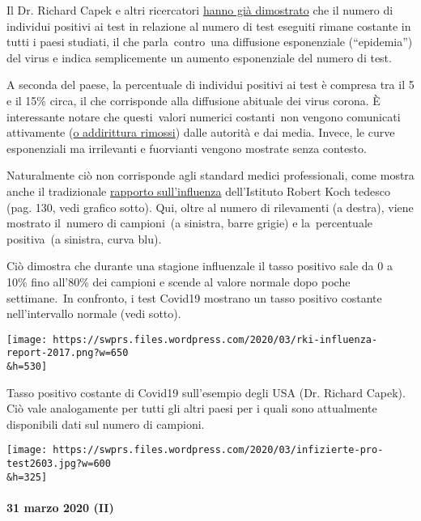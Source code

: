 Il Dr. Richard Capek e altri ricercatori
\href{https://coronadaten.wordpress.com/}{hanno già dimostrato} che il
numero di individui positivi ai test in relazione al numero di test
eseguiti rimane costante in tutti i paesi studiati, il che
parla~contro~una diffusione esponenziale (``epidemia'') del virus e
indica semplicemente un aumento esponenziale del numero di test.

A seconda del paese, la percentuale di individui positivi ai test è
compresa tra il 5 e il 15\% circa, il che corrisponde alla diffusione
abituale dei virus corona. È interessante notare che questi~valori
numerici costanti~non vengono comunicati attivamente
(\href{https://multipolar-magazin.de/artikel/coronavirus-irrefuhrung-fallzahlen}{o
addirittura rimossi}) dalle autorità e dai media. Invece, le curve
esponenziali ma irrilevanti e fuorvianti vengono mostrate senza
contesto.

Naturalmente ciò non corrisponde agli standard medici professionali,
come mostra anche il tradizionale
\href{https://influenza.rki.de/Saisonberichte/2017.pdf}{rapporto
sull'influenza} dell'Istituto Robert Koch tedesco (pag. 130, vedi
grafico sotto). Qui, oltre al numero di rilevamenti (a destra), viene
mostrato il~numero di campioni~(a sinistra, barre grigie) e
la~percentuale positiva~(a sinistra, curva blu).

Ciò dimostra che durante una stagione influenzale il tasso positivo sale
da 0 a 10\% fino all'80\% dei campioni e scende al valore normale dopo
poche settimane.~In confronto, i test Covid19 mostrano un tasso positivo
costante nell'intervallo normale (vedi sotto).

\texttt{[image: https://swprs.files.wordpress.com/2020/03/rki-influenza-report-2017.png?w=650\\\&h=530]}

Tasso positivo costante di Covid19 sull'esempio degli USA (Dr. Richard
Capek). Ciò vale analogamente per tutti gli altri paesi per i quali sono
attualmente disponibili dati sul numero di campioni.

\texttt{[image: https://swprs.files.wordpress.com/2020/03/infizierte-pro-test2603.jpg?w=600\\\&h=325]}

\hypertarget{31-marzo-2020-ii}{%
\paragraph{31 marzo 2020 (II)}\label{31-marzo-2020-ii}}

